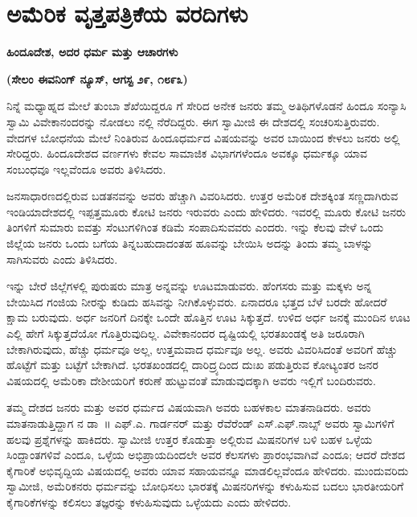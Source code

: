 
\chapter{ಅಮೆರಿಕ ವೃತ್ತಪತ್ರಿಕೆಯ ವರದಿಗಳು}

\begin{center}
\textbf{ಹಿಂದೂದೇಶ, ಅದರ ಧರ್ಮ ಮತ್ತು ಆಚಾರಗಳು}
\end{center}

\begin{center}
\textbf{(ಸೇಲಂ ಈವನಿಂಗ್​ ನ್ಯೂಸ್​, ಆಗಸ್ಟ ೨೯, ೧೮೯೩)}
\end{center}

ನಿನ್ನೆ ಮಧ್ಯಾಹ್ನದ ಮೇಲೆ ತುಂಬಾ ಶೆಖೆಯಿದ್ದರೂ  ಗೆ ಸೇರಿದ ಅನೇಕ ಜನರು ತಮ್ಮ ಅತಿಥಿಗಳೊಡನೆ ಹಿಂದೂ ಸಂನ್ಯಾಸಿ ಸ್ವಾಮಿ ವಿವೇಕಾನಂದರನ್ನು ನೋಡಲು  ನಲ್ಲಿ ನೆರೆದಿದ್ದರು. ಈಗ ಸ್ವಾಮೀಜಿ ಈ ದೇಶದಲ್ಲಿ ಸಂಚರಿಸುತ್ತಿರುವರು. ವೇದಗಳ ಬೋಧನೆಯ ಮೇಲೆ ನಿಂತಿರುವ ಹಿಂದೂಧರ್ಮದ ವಿಷಯವನ್ನು ಅವರ ಬಾಯಿಂದ ಕೇಳಲು ಜನರು ಅಲ್ಲಿ ಸೇರಿದ್ದರು. ಹಿಂದೂದೇಶದ ವರ್ಣಗಳು ಕೇವಲ ಸಾಮಾಜಿಕ ವಿಭಾಗಗಳೆಂದೂ ಅವಕ್ಕೂ ಧರ್ಮಕ್ಕೂ ಯಾವ ಸಂಬಂಧವೂ ಇಲ್ಲವೆಂದೂ ಅವರು ತಿಳಿಸಿದರು.

ಜನಸಾಧಾರಣದಲ್ಲಿರುವ ಬಡತನವನ್ನು ಅವರು ಹೆಚ್ಚಾಗಿ ವಿವರಿಸಿದರು. ಉತ್ತರ ಅಮೆರಿಕ ದೇಶಕ್ಕಿಂತ ಸಣ್ಣದಾಗಿರುವ ಇಂಡಿಯಾದೇಶದಲ್ಲಿ ಇಪ್ಪತ್ತಮೂರು ಕೋಟಿ ಜನರು ಇರುವರು ಎಂದು ಹೇಳಿದರು. ಇವರಲ್ಲಿ ಮೂರು ಕೋಟಿ ಜನರು ತಿಂಗಳಿಗೆ ಸುಮಾರು ಐವತ್ತು ಸೆಂಟುಗಳಿಗಿಂತ ಕಡಿಮೆ ಸಂಪಾದಿಸುವವರು ಎಂದರು. ಇನ್ನು ಕೆಲವು ವೇಳೆ ಒಂದು ಜಿಲ್ಲೆಯ ಜನರು ಒಂದು ಬಗೆಯ ತಿನ್ನಬಹುದಾದಂತಹ ಹೂವನ್ನು ಬೇಯಿಸಿ ಅದನ್ನು ತಿಂದು ತಮ್ಮ ಬಾಳನ್ನು ಸಾಗಿಸುವರು ಎಂದು ತಿಳಿಸಿದರು.

ಇನ್ನು ಬೇರೆ ಜಿಲ್ಲೆಗಳಲ್ಲಿ ಪುರುಷರು ಮಾತ್ರ ಅನ್ನವನ್ನು ಊಟಮಾಡುವರು. ಹೆಂಗಸರು ಮತ್ತು ಮಕ್ಕಳು ಅನ್ನ ಬೇಯಿಸಿದ ಗಂಜಿಯ ನೀರನ್ನು ಕುಡಿದು ಹಸಿವನ್ನು ನೀಗಿಕೊಳ್ಳುವರು. ಏನಾದರೂ ಭತ್ತದ ಬೆಳೆ ಬರದೇ ಹೋದರೆ ಕ್ಷಾಮ ಬರುವುದು. ಅರ್ಧ ಜನರಿಗೆ ದಿನಕ್ಕೇ ಒಂದೇ ಹೊತ್ತಿನ ಊಟ ಸಿಕ್ಕುತ್ತದೆ. ಉಳಿದ ಅರ್ಧ ಜನಕ್ಕೆ ಮುಂದಿನ ಊಟ ಎಲ್ಲಿ ಹೇಗೆ ಸಿಕ್ಕುತ್ತದೆಯೋ ಗೊತ್ತಿರುವುದಿಲ್ಲ. ವಿವೇಕಾನಂದರ ದೃಷ್ಟಿಯಲ್ಲಿ ಭರತಖಂಡಕ್ಕೆ ಅತಿ ಜರೂರಾಗಿ ಬೇಕಾಗಿರುವುದು, ಹೆಚ್ಚು ಧರ್ಮವೂ ಅಲ್ಲ, ಉತ್ತಮವಾದ ಧರ್ಮವೂ ಅಲ್ಲ. ಅವರು ವಿವರಿಸಿದಂತೆ ಅವರಿಗೆ ಹೆಚ್ಚು ಹೊಟ್ಟೆಗೆ ಮತ್ತು ಬಟ್ಟೆಗೆ ಬೇಕಾಗಿದೆ. ಭರತಖಂಡದಲ್ಲಿ ದಾರಿದ್ರ್ಯದಿಂದ ದುಃಖ ಪಡುತ್ತಿರುವ ಕೋಟ್ಯಂತರ ಜನರ ವಿಷಯದಲ್ಲಿ ಅಮೆರಿಕಾ ದೇಶೀಯರಿಗೆ ಕರುಣೆ ಹುಟ್ಟುವಂತೆ ಮಾಡುವುದಕ್ಕಾಗಿ ಅವರು ಇಲ್ಲಿಗೆ ಬಂದಿರುವರು.

ತಮ್ಮ ದೇಶದ ಜನರು ಮತ್ತು ಅವರ ಧರ್ಮದ ವಿಷಯವಾಗಿ ಅವರು ಬಹಳಕಾಲ ಮಾತನಾಡಿದರು. ಅವರು ಮಾತನಾಡುತ್ತಿದ್ದಾಗ  ನ ಡಾ~॥ ಎಫ್​.ಎ. ಗಾರ್ಡನರ್​ ಮತ್ತು ರೆವೆರೆಂಡ್​ ಎಸ್​.ಎಫ್​.ನಾಬ್ಸ್​ ಅವರು ಸ್ವಾಮಿಗಳಿಗೆ ಹಲವು ಪ್ರಶ್ನೆಗಳನ್ನು ಹಾಕಿದರು. ಸ್ವಾಮೀಜಿ ಉತ್ತರ ಕೊಡುತ್ತಾ ಅಲ್ಲಿರುವ ಮಿಷನರಿಗಳ ಬಳಿ ಬಹಳ ಒಳ್ಳೆಯ ಸಿಂದ್ದಾಂತಗಳಿವೆ ಎಂದೂ, ಒಳ್ಳೆಯ ಅಭಿಪ್ರಾಯದಿಂದಲೇ ಅವರ ಕೆಲಸಗಳು ಪ್ರಾರಂಭವಾಗಿವೆ ಎಂದೂ; ಆದರೆ ದೇಶದ ಕೈಗಾರಿಕೆ ಅಭಿವೃದ್ದಿಯ ವಿಷಯದಲ್ಲಿ ಅವರು ಯಾವ ಸಹಾಯವನ್ನೂ ಮಾಡಲಿಲ್ಲವೆಂದೂ ಹೇಳಿದರು. ಮುಂದುವರಿದು ಸ್ವಾಮೀಜಿ, ಅಮೆರಿಕನರು ಧರ್ಮವನ್ನು ಬೋಧಿಸಲು ಭಾರತಕ್ಕೆ ಮಿಷನರಿಗಳನ್ನು ಕಳುಹಿಸುವ ಬದಲು ಭಾರತೀಯರಿಗೆ ಕೈಗಾರಿಕೆಗಳನ್ನು ಕಲಿಸಲು ತಜ್ಞರನ್ನು ಕಳುಹಿಸುವುದು ಒಳ್ಳೆಯದು ಎಂದು ಹೇಳಿದರು.

